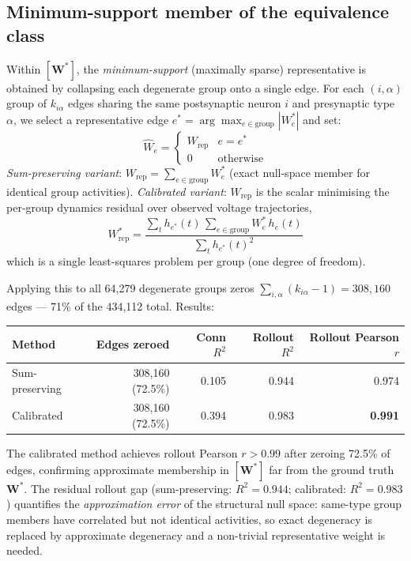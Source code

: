 \documentclass[11pt,a4paper]{article}
\begin{document}
\subsection{Minimum-support member of the equivalence class}
\label{subsec:sparse}

Within $[\mathbf{W}^*]$, the \emph{minimum-support} (maximally sparse)
representative is obtained by collapsing each degenerate group onto a single
edge.  For each $(i,\alpha)$ group of $k_{i\alpha}$ edges sharing the same
postsynaptic neuron $i$ and presynaptic type $\alpha$, we select a
representative edge $e^* = \arg\max_{e \in \text{group}} |W_e^*|$ and set:
\begin{equation}
\hat{W}_e =
\begin{cases}
W_{\text{rep}} & e = e^* \\
0 & \text{otherwise}
\end{cases}
\end{equation}
\emph{Sum-preserving variant}: $W_{\text{rep}} = \sum_{e \in \text{group}} W_e^*$ (exact null-space member for identical group activities). \emph{Calibrated variant}: $W_{\text{rep}}$ is the scalar minimising the per-group dynamics residual over observed voltage trajectories,
\begin{equation}
W_{\text{rep}}^* = \frac{\sum_t h_{e^*}(t)\,\sum_{e\in\text{group}} W_e^*\,h_e(t)}
                        {\sum_t h_{e^*}(t)^2}
\end{equation}
which is a single least-squares problem per group (one degree of freedom).

Applying this to all 64,279 degenerate groups zeros
$\sum_{i,\alpha}(k_{i\alpha}-1)=308{,}160$ edges --- 71\% of the 434,112
total.  Results:

\begin{center}
\begin{tabular}{lrrrr}
\toprule
Method & Edges zeroed & Conn $R^2$ & Rollout $R^2$ & Rollout Pearson $r$ \\
\midrule
Sum-preserving & 308,160 (72.5\%) & 0.105 & 0.944 & 0.974 \\
Calibrated     & 308,160 (72.5\%) & 0.394 & 0.983 & \textbf{0.991} \\
\bottomrule
\end{tabular}
\end{center}

The calibrated method achieves rollout Pearson $r > 0.99$ after zeroing 72.5\%
of edges, confirming approximate membership in $[\mathbf{W}^*]$ far from the
ground truth $\mathbf{W}^*$.  The residual rollout gap (sum-preserving:
$R^2=0.944$; calibrated: $R^2=0.983$) quantifies the \emph{approximation
error} of the structural null space: same-type group members have correlated
but not identical activities, so exact degeneracy is replaced by approximate
degeneracy and a non-trivial representative weight is needed.
\end{document}
